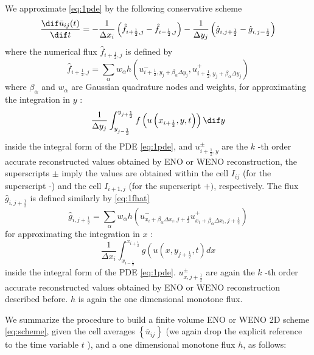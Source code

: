 \documentclass[12pt]{article}
\begin{document}
We approximate \cref{eq:1pde} by the following conservative scheme
\begin{equation}
	\frac{\dif \bar{u}_{i j}(t)}{\dif t}=-\frac{1}{\Delta x_{i}}\left(\hat{f}_{i+\frac{1}{2}, j}-\hat{f}_{i-\frac{1}{2}, j}\right)-\frac{1}{\Delta y_{j}}\left(\hat{g}_{i, j+\frac{1}{2}}-\hat{g}_{i, j-\frac{1}{2}}\right)
	\label{eq:scheme}
\end{equation}where the numerical flux $\hat{f}_{i+\frac{1}{2}, j}$ is defined by
\begin{equation}
	\hat{f}_{i+\frac{1}{2}, j}=\sum_{\alpha} w_{\alpha} h\left(u_{i+\frac{1}{2}, y_{j}+\beta_{\alpha} \Delta y_{j}}^{-}, u_{i+\frac{1}{2}, y_{j}+\beta_{\alpha} \Delta y_{j}}^{+}\right)
	\label{eq:1fhat}
\end{equation}
where $\beta_{\alpha}$ and $w_{\alpha}$ are Gaussian quadrature nodes and weights, for approximating the integration in $y$ :
\begin{equation}
	\frac{1}{\Delta y_{j}} \int_{y_{j-\frac{1}{2}}}^{y_{j+\frac{1}{2}}} f\left(u\left(x_{i+\frac{1}{2}}, y, t\right)\right) \dif y
\end{equation}
inside the integral form of the PDE \cref{eq:1pde}, and $u_{i+\frac{1}{2}, y}^{\pm}$ are the $k$ -th order accurate reconstructed values obtained by ENO or WENO reconstruction, the superscripts $\pm$ imply the values are obtained within the cell $I_{i j}$ (for the superscript -) and the cell $I_{i+1, j}$ (for the superscript $+)$, respectively. The flux $\hat{g}_{i, j+\frac{1}{2}}$ is defined similarly by \cref{eq:1fhat}
\begin{equation}
	\hat{g}_{i, j+\frac{1}{2}}=\sum_{\alpha} w_{\alpha} h\left(u_{x_{i}+\beta_{\alpha} \Delta x_{i}, j+\frac{1}{2}}^{-} u_{x_{i}+\beta_{\alpha} \Delta x_{i}, j+\frac{1}{2}}^{+}\right)
	\label{eq:1ghat}
\end{equation}
for approximating the integration in $x$ :
\begin{equation}
	\frac{1}{\Delta x_{i}} \int_{x_{i-\frac{1}{2}}}^{x_{i+\frac{1}{2}}} g\left(u\left(x, y_{j+\frac{1}{2}}, t\right) d x\right.
\end{equation}
inside the integral form of the PDE \cref{eq:1pde}. $u_{x, j+\frac{1}{2}}^{\pm}$ are again the $k$ -th order accurate reconstructed values obtained by ENO or WENO reconstruction described before. $h$ is again the one dimensional monotone flux.

We summarize the procedure to build a finite volume ENO or WENO 2D scheme \cref{eq:scheme}, given the cell averages $\left\{\bar{u}_{i j}\right\}$ (we again drop the explicit reference to the time variable $t$ ), and a one dimensional monotone flux $h$, as follows:
\end{document}
